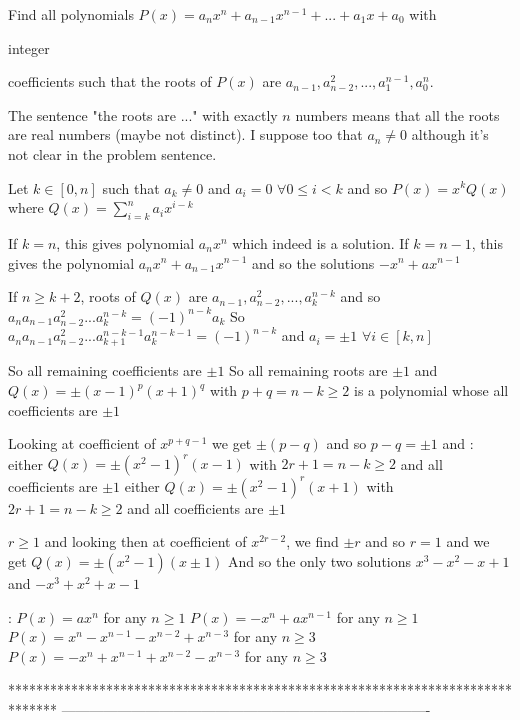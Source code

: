 \begin{solution}
	\begin{tcolorbox}Find all polynomials $P(x)=a_nx^n+a_{n-1}x^{n-1}+...+a_1x+a_0$ with \begin{bolded}integer\end{bolded} coefficients such that the roots of $P(x)$ are $a_{n-1}, a_{n-2}^2,...,a_1^{n-1},a_0^n$.\end{tcolorbox}
The sentence "the roots are ..." with exactly $n$ numbers means that all the roots are real numbers (maybe not distinct).
I suppose too that $a_n\ne 0$ although it's not clear in the problem sentence.

Let $k\in[0,n]$ such that $a_k\ne 0$ and $a_i=0$ $\forall 0\le i<k$ and so $P(x)=x^{k}Q(x)$ where $Q(x)=\sum_{i=k}^na_ix^{i-k}$

If $k=n$, this gives polynomial $a_nx^n$ which indeed is a solution.
If $k=n-1$, this gives the polynomial $a_nx^n+a_{n-1}x^{n-1}$ and so the solutions $-x^n+ax^{n-1}$

If $n\ge k+2$, roots of $Q(x)$ are $a_{n-1},a_{n-2}^2,...,a_k^{n-k}$ and so $a_na_{n-1}a_{n-2}^2...a_k^{n-k}=(-1)^{n-k}a_k$
So $a_na_{n-1}a_{n-2}^2...a_{k+1}^{n-k-1}a_k^{n-k-1}=(-1)^{n-k}$ and $a_i=\pm 1$ $\forall i\in[k,n]$

So all remaining coefficients are $\pm 1$
So all remaining roots are $\pm 1$ and $Q(x)=\pm(x-1)^p(x+1)^q$ with $p+q=n-k\ge 2$ is a polynomial whose all coefficients are $\pm 1$

Looking at coefficient of $x^{p+q-1}$ we get $\pm(p-q)$ and so $p-q=\pm 1$ and :
either $Q(x)=\pm(x^2-1)^r(x-1)$ with $2r+1=n-k\ge 2$ and all coefficients are $\pm 1$
either $Q(x)=\pm(x^2-1)^r(x+1)$ with $2r+1=n-k\ge 2$ and all coefficients are $\pm 1$

$r\ge 1$ and looking then at coefficient of $x^{2r-2}$, we find $\pm r$ and so $r=1$ and we get $Q(x)=\pm(x^2-1)(x\pm 1)$
And so the only two solutions $x^3-x^2-x+1$ and $-x^3+x^2+x-1$

:
$P(x)=ax^n$ for any $n\ge 1$
$P(x)=-x^n+ax^{n-1}$ for any $n\ge 1$
$P(x)=x^n-x^{n-1}-x^{n-2}+x^{n-3}$  for any $n\ge 3$
$P(x)=-x^n+x^{n-1}+x^{n-2}-x^{n-3}$  for any $n\ge 3$
\end{solution}
*******************************************************************************
-------------------------------------------------------------------------------

